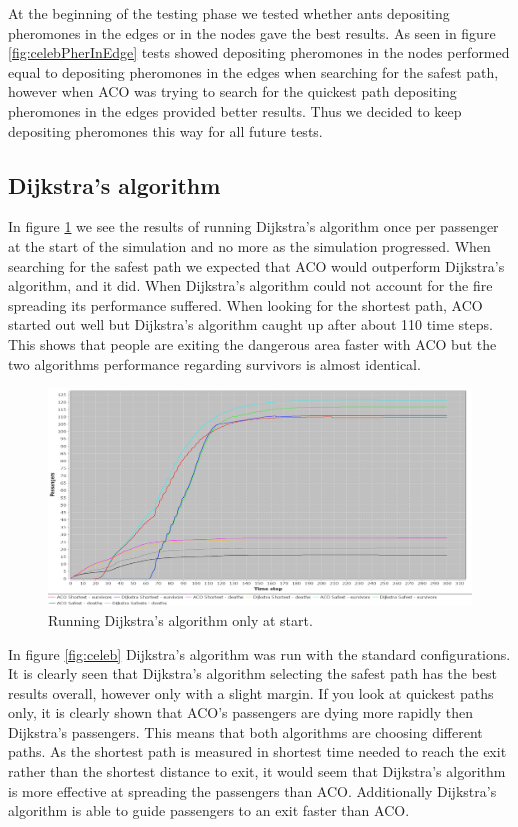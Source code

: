 At the beginning of the testing phase we tested whether ants depositing pheromones in the edges or in the nodes gave the best results.  As seen in figure \ref{fig:celebPherInEdge} tests showed depositing pheromones in the nodes performed equal to depositing pheromones in the edges when searching for the safest path, however when ACO was trying to search for the quickest path depositing pheromones in the edges provided better results. Thus we decided to keep depositing pheromones this way for all future tests.

\subsection{Dijkstra's algorithm}

In figure \ref{fig:celebDF} we see the results of running Dijkstra's algorithm once per passenger at the start of the simulation and no more as the simulation progressed. When searching for the safest path we expected that ACO would outperform Dijkstra's algorithm, and it did. When Dijkstra's algorithm could not account for the fire spreading its performance suffered. When looking for the shortest path, ACO started out well but Dijkstra's algorithm caught up after about 110 time steps. This shows that people are exiting the dangerous area faster with ACO but the two algorithms performance regarding survivors is almost identical.

\begin{figure} [h]
\centering
\hspace*{-1.0in}
\includegraphics[scale=0.35]{images/Graph-using-200-rounds-140-passangers-and-dijkstra-one-time.png}
\caption{Running Dijkstra's algorithm only at start.}
\label{fig:celebDF}
\end{figure}

In figure \ref{fig:celeb} Dijkstra's algorithm was run with the standard configurations. It is clearly seen that Dijkstra's algorithm selecting the safest path has the best results overall, however only with a slight margin. If you look at quickest paths only, it is clearly shown that ACO's passengers are dying more rapidly then Dijkstra's passengers. This means that both algorithms are choosing different paths. As the shortest path is measured in shortest time needed to reach the exit rather than the shortest distance to exit, it would seem that Dijkstra's algorithm is more effective at spreading the passengers than ACO. Additionally Dijkstra's algorithm is able to guide passengers to an exit faster than ACO.

